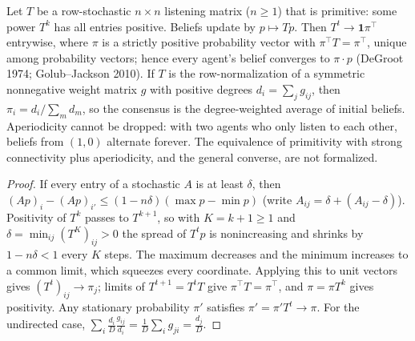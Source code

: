 \begin{theorem}
\label{thm:beh-degroot}
\leanok
Let $T$ be a row-stochastic $n\times n$ listening matrix ($n\ge1$) that is primitive: some power $T^k$ has all
entries positive. Beliefs update by $p\mapsto Tp$. Then $T^t\to\mathbf 1\pi^\top$ entrywise, where $\pi$ is a
strictly positive probability vector with $\pi^\top T=\pi^\top$, unique among probability vectors; hence every
agent's belief converges to $\pi\cdot p$ (DeGroot 1974; Golub--Jackson 2010). If $T$ is the row-normalization of a
symmetric nonnegative weight matrix $g$ with positive degrees $d_i=\sum_j g_{ij}$, then $\pi_i=d_i/\sum_m d_m$, so
the consensus is the degree-weighted average of initial beliefs. Aperiodicity cannot be dropped: with two agents who
only listen to each other, beliefs from $(1,0)$ alternate forever. The equivalence of primitivity with strong
connectivity plus aperiodicity, and the general converse, are not formalized.
\end{theorem}
\begin{proof}
\leanok
If every entry of a stochastic $A$ is at least $\delta$, then
$(Ap)_i-(Ap)_{i'}\le(1-n\delta)(\max p-\min p)$ (write $A_{ij}=\delta+(A_{ij}-\delta)$). Positivity of $T^k$ passes to
$T^{k+1}$, so with $K=k+1\ge1$ and $\delta=\min_{ij}(T^K)_{ij}>0$ the spread of $T^tp$ is nonincreasing and shrinks
by $1-n\delta<1$ every $K$ steps. The maximum decreases and the minimum increases to a common limit, which squeezes every
coordinate. Applying this to unit vectors gives $(T^t)_{ij}\to\pi_j$; limits of $T^{t+1}=T^tT$ give $\pi^\top T=\pi^\top$,
and $\pi=\pi T^k$ gives positivity. Any stationary probability $\pi'$ satisfies $\pi'=\pi'T^t\to\pi$. For the
undirected case, $\sum_i\frac{d_i}{D}\frac{g_{ij}}{d_i}=\frac{1}{D}\sum_i g_{ji}=\frac{d_j}{D}$.
\end{proof}
